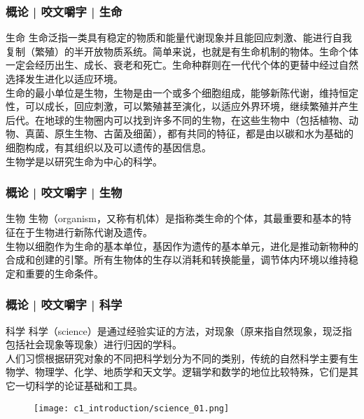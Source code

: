 \begin{frame}
  \frametitle{概论 | 咬文嚼字 | 生命}
  \begin{block}{生命}
生命泛指一类具有稳定的物质和能量代谢现象并且能回应刺激、能进行自我复制（繁殖）的半开放物质系统。简单来说，也就是有生命机制的物体。生命个体一定会经历出生、成长、衰老和死亡。生命种群则在一代代个体的更替中经过自然选择发生进化以适应环境。\\
    \vspace{1em}
生命的最小单位是生物，生物是由一个或多个细胞组成，能够新陈代谢，维持恒定性，可以成长，回应刺激，可以繁殖甚至演化，以适应外界环境，继续繁殖并产生后代。在地球的生物圈内可以找到许多不同的生物，在这些生物中（包括植物、动物、真菌、原生生物、古菌及细菌），都有共同的特征，都是由以碳和水为基础的细胞构成，有其组织以及可以遗传的基因信息。\\
    \vspace{1em}
生物学是以研究生命为中心的科学。 
  \end{block}
\end{frame}

\begin{frame}[t]
  \frametitle{概论 | 咬文嚼字 | 生物}
  \begin{block}{生物}
    生物（organism，又称有机体）是指称类生命的个体，其最重要和基本的特征在于生物进行新陈代谢及遗传。\\
生物以细胞作为生命的基本单位，基因作为遗传的基本单元，进化是推动新物种的合成和创建的引擎。所有生物体的生存以消耗和转换能量，调节体内环境以维持稳定和重要的生命条件。
  \end{block}
  \begin{figure}
    \centering
    \qquad
  \end{figure}
\end{frame}

\begin{frame}
  \frametitle{概论 | 咬文嚼字 | 科学}
  \begin{block}{科学}
    科学（science）是通过经验实证的方法，对现象（原来指自然现象，现泛指包括社会现象等现象）进行归因的学科。\\
    \vspace{1em}
人们习惯根据研究对象的不同把科学划分为不同的类别，传统的自然科学主要有生物学、物理学、化学、地质学和天文学。逻辑学和数学的地位比较特殊，它们是其它一切科学的论证基础和工具。
  \end{block}
  \begin{figure}
    \centering
    \texttt{[image: c1\_introduction/science\_01.png]}
  \end{figure}
\end{frame}

